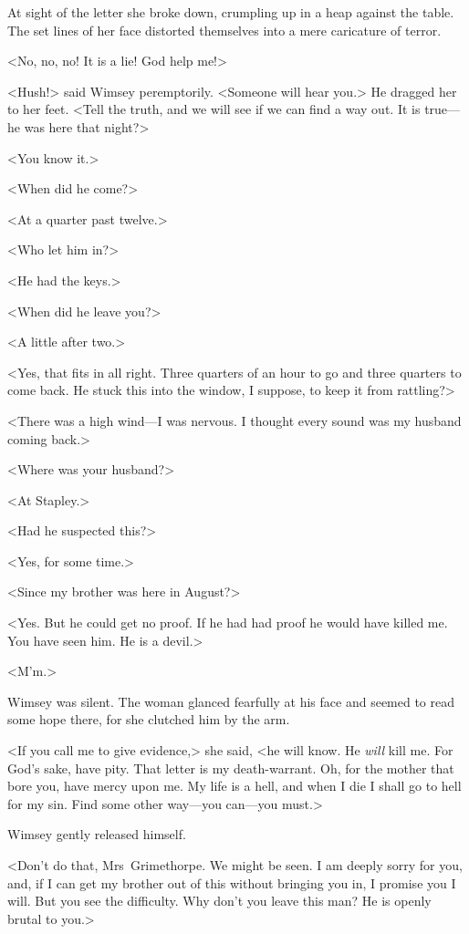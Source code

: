 At sight of the letter she broke down, crumpling up in a heap against the table. The set lines of her face distorted themselves into a mere caricature of terror.

<No, no, no! It is a lie! God help me!>

<Hush!> said Wimsey peremptorily. <Someone will hear you.> He dragged her to her feet. <Tell the truth, and we will see if we can find a way out. It is true—he was here that night?>

<You know it.>

<When did he come?>

<At a quarter past twelve.>

<Who let him in?>

<He had the keys.>

<When did he leave you?>

<A little after two.>

<Yes, that fits in all right. Three quarters of an hour to go and three quarters to come back. He stuck this into the window, I suppose, to keep it from rattling?>

<There was a high wind—I was nervous. I thought every sound was my husband coming back.>

<Where was your husband?>

<At Stapley.>

<Had he suspected this?>

<Yes, for some time.>

<Since my brother was here in August?>

<Yes. But he could get no proof. If he had had proof he would have killed me. You have seen him. He is a devil.>

<M'm.>

Wimsey was silent. The woman glanced fearfully at his face and seemed to read some hope there, for she clutched him by the arm.

<If you call me to give evidence,> she said, <he will know. He \emph{will} kill me. For God's sake, have pity. That letter is my death-warrant.  Oh, for the mother that bore you, have mercy upon me. My life is a hell, and when I die I shall go to hell for my sin. Find some other way—you can—you must.>

Wimsey gently released himself.

<Don't do that, Mrs~Grimethorpe. We might be seen. I am deeply sorry for you, and, if I can get my brother out of this without bringing you in, I promise you I will. But you see the difficulty. Why don't you leave this man? He is openly brutal to you.>

